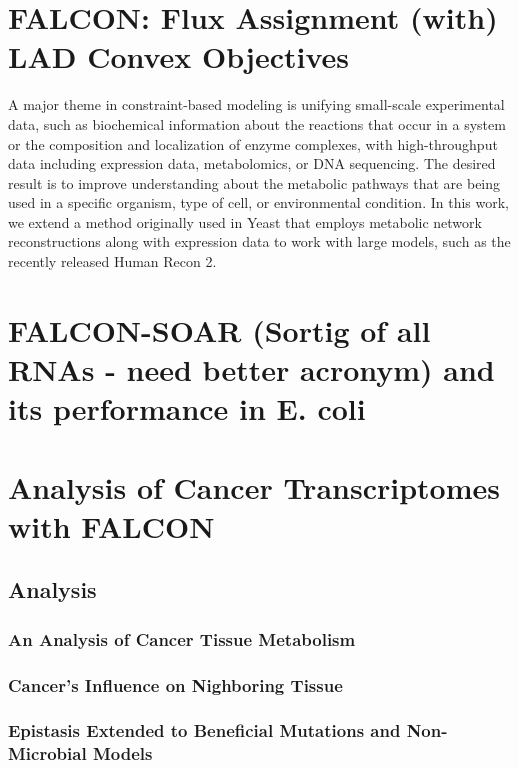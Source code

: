 \documentclass[phd,tocprelim]{cornell}
\theoremstyle{break}
\theoremstyle{empty}
\begin{document}
\chapter{FALCON: Flux Assignment (with) LAD Convex Objectives}

A major theme in constraint-based modeling is unifying small-scale
experimental data, such as biochemical information about the reactions
that occur in a system or the composition and localization of enzyme
complexes, with high-throughput data including expression data,
metabolomics, or DNA sequencing. The desired result is to improve
understanding about the metabolic pathways that are being used in a
specific organism, type of cell, or environmental condition.  In this
work, we extend a method originally used in Yeast that employs
metabolic network reconstructions along with expression data to work
with large models, such as the recently released Human Recon 2.


\chapter{FALCON-SOAR (Sortig of all RNAs - need better acronym) and its performance in E. coli} 


\chapter{Analysis of Cancer Transcriptomes with FALCON}

\section{Analysis}

\subsection{An Analysis of Cancer Tissue Metabolism}
\subsection{Cancer's Influence on Nighboring Tissue}
\subsection{Epistasis Extended to Beneficial Mutations and Non-Microbial Models}
\end{document}
